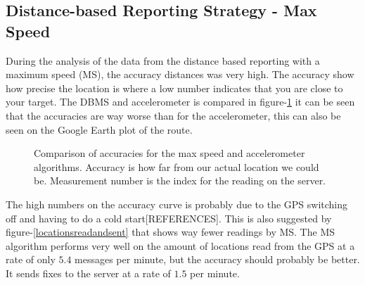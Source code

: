 \subsection{Distance-based Reporting Strategy - Max Speed}
During the analysis of the data from the distance based reporting with a maximum speed (MS), the accuracy distances was very high. The accuracy show how precise the location is where a low number indicates that you are close to your target. The DBMS and accelerometer is compared in figure-\ref{maxspeedaccelerometeraccuracy} it can be seen that the accuracies are way worse than for the accelerometer, this can also be seen on the Google Earth plot of the route.

\begin{figure}[h]

\caption{Comparison of accuracies for the max speed and accelerometer algorithms. Accuracy is how far from our actual location we could be. Measurement number is the index for the reading on the server.}
\label{maxspeedaccelerometeraccuracy}
\end{figure}

The high numbers on the accuracy curve is probably due to the GPS switching off and having to do a cold start[REFERENCES]. This is also suggested by figure-\ref{locationsreadandsent} that shows way fewer readings by MS. The MS algorithm performs very well on the amount of locations read from the GPS at a rate of only $5.4$ messages per minute, but the accuracy should probably be better. It sends fixes to the server at a rate of $1.5$ per minute.